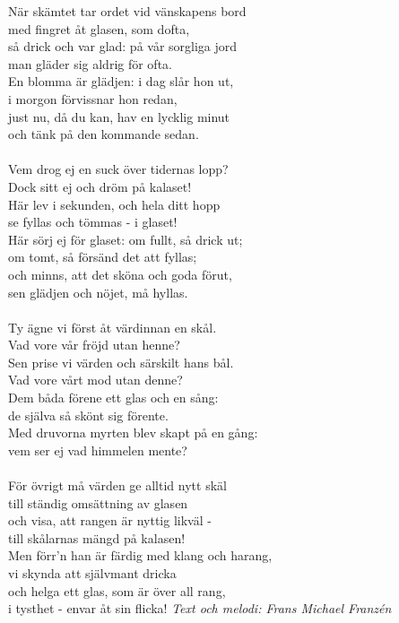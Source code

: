 \vspace{10pt}
\par
När skämtet tar ordet vid vänskapens bord\\
med fingret åt glasen, som dofta,\\
så drick och var glad: på vår sorgliga jord\\
man gläder sig aldrig för ofta.\\
En blomma är glädjen: i dag slår hon ut,\\
i morgon förvissnar hon redan,\\
just nu, då du kan, hav en lycklig minut\\
och tänk på den kommande sedan.\\
\\
Vem drog ej en suck över tidernas lopp?\\
Dock sitt ej och dröm på kalaset!\\
Här lev i sekunden, och hela ditt hopp\\
se fyllas och tömmas - i glaset!\\
Här sörj ej för glaset: om fullt, så drick ut;\\
om tomt, så försänd det att fyllas;\\
och minns, att det sköna och goda förut,\\
sen glädjen och nöjet, må hyllas.\\
\\
Ty ägne vi först åt värdinnan en skål.\\
Vad vore vår fröjd utan henne?\\
Sen prise vi värden och särskilt hans bål.\\
Vad vore vårt mod utan denne?\\
Dem båda förene ett glas och en sång:\\
de själva så skönt sig förente.\\
Med druvorna myrten blev skapt på en gång:\\
vem ser ej vad himmelen mente?\\
\\
För övrigt må värden ge alltid nytt skäl\\
till ständig omsättning av glasen\\
och visa, att rangen är nyttig likväl -\\
till skålarnas mängd på kalasen!\\
Men förr'n han är färdig med klang och harang,\\
vi skynda att självmant dricka\\
och helga ett glas, som är över all rang,\\
i tysthet - envar åt sin flicka!
\vspace{10pt}
{\footnotesize\textit{Text och melodi: Frans Michael Franzén}}
